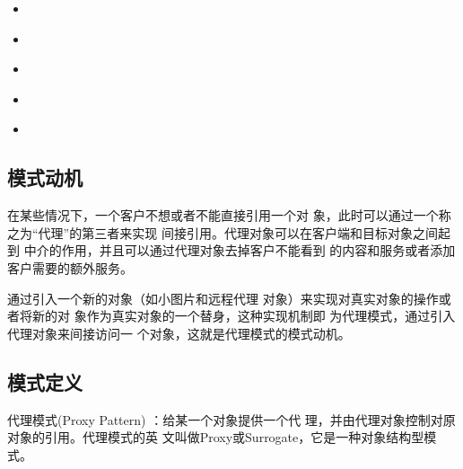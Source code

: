 \documentclass[letterpaper,10pt,english]{sphinxmanual}
\begin{document}
\begin{sphinxShadowBox}
\begin{itemize}
\begin{itemize}
\item {} 
\sphinxAtStartPar
{}\label{\detokenize{structural_patterns/proxy:id25}}{\hyperref[\detokenize{structural_patterns/proxy:id11}]{}}

\item {} 
\sphinxAtStartPar
{}\label{\detokenize{structural_patterns/proxy:id26}}{\hyperref[\detokenize{structural_patterns/proxy:id12}]{}}

\item {} 
\sphinxAtStartPar
{}\label{\detokenize{structural_patterns/proxy:id27}}{\hyperref[\detokenize{structural_patterns/proxy:id13}]{}}

\item {} 
\sphinxAtStartPar
{}\label{\detokenize{structural_patterns/proxy:id28}}{\hyperref[\detokenize{structural_patterns/proxy:id14}]{}}

\item {} 
\sphinxAtStartPar
{}\label{\detokenize{structural_patterns/proxy:id29}}{\hyperref[\detokenize{structural_patterns/proxy:id15}]{}}

\end{itemize}

\end{itemize}
\end{sphinxShadowBox}


\subsection{模式动机}
\label{\detokenize{structural_patterns/proxy:id3}}
\sphinxAtStartPar
在某些情况下，一个客户不想或者不能直接引用一个对 象，此时可以通过一个称之为“代理”的第三者来实现 间接引用。代理对象可以在客户端和目标对象之间起到 中介的作用，并且可以通过代理对象去掉客户不能看到 的内容和服务或者添加客户需要的额外服务。

\sphinxAtStartPar
通过引入一个新的对象（如小图片和远程代理 对象）来实现对真实对象的操作或者将新的对 象作为真实对象的一个替身，这种实现机制即 为代理模式，通过引入代理对象来间接访问一 个对象，这就是代理模式的模式动机。


\subsection{模式定义}
\label{\detokenize{structural_patterns/proxy:id4}}
\sphinxAtStartPar
代理模式(Proxy Pattern) ：给某一个对象提供一个代 理，并由代理对象控制对原对象的引用。代理模式的英 文叫做Proxy或Surrogate，它是一种对象结构型模式。
\end{document}
